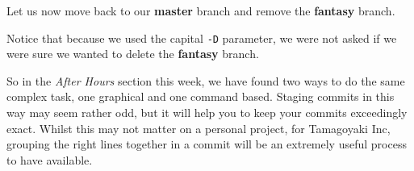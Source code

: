 Let us now move back to our \textbf{master} branch and remove the \textbf{fantasy} branch.


Notice that because we used the capital \texttt{-D} parameter, we were not asked if we were sure we wanted to delete the \textbf{fantasy} branch.

So in the \emph{After Hours} section this week, we have found two ways to do the same complex task, one graphical and one command based.
Staging commits in this way may seem rather odd, but it will help you to keep your commits exceedingly exact.
Whilst this may not matter on a personal project, for Tamagoyaki Inc, grouping the right lines together in a commit will be an extremely useful process to have available.

